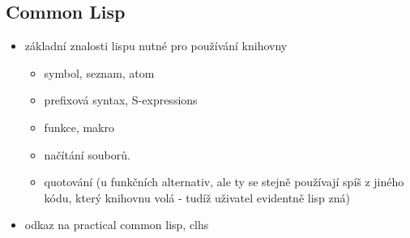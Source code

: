 \subsection{Common Lisp}
\begin{framed}
\begin{itemize}
  \item základní znalosti lispu nutné pro používání knihovny
  \begin{itemize}
    \item symbol, seznam, atom
    \item prefixová syntax, S-expressions
    \item funkce, makro
    \item načítání souborů.
    \item quotování (u funkčních alternativ, ale ty se stejně používají spíš z jiného
      kódu, který knihovnu volá - tudíž uživatel evidentně lisp zná)
  \end{itemize}
  \item odkaz na practical common lisp, clhs
\end{itemize}
\end{framed}

